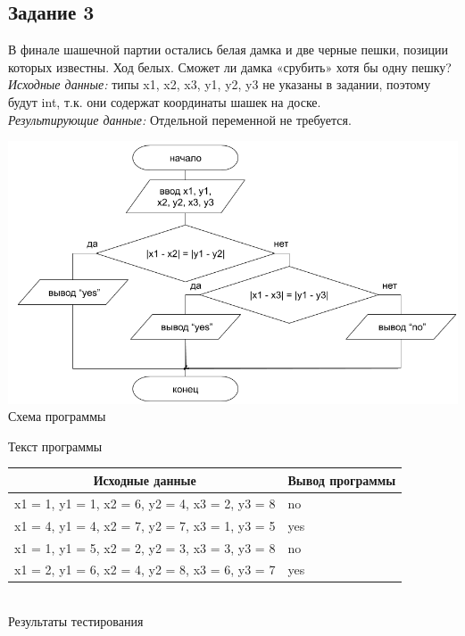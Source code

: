 \documentclass[a4paper,14pt]{extarticle}
\begin{document}
\subsection{Задание 3}
В финале шашечной партии остались белая дамка и две черные пешки, позиции которых известны. Ход белых. Сможет ли дамка «срубить» хотя бы одну пешку?\\
\textit{Исходные данные:} типы x1, x2, x3, y1, y2, y3 не указаны в задании, поэтому будут int, т.к. они содержат координаты шашек на доске.\\
\textit{Результирующие данные:} Отдельной переменной не требуется.\\
\begin{center}
\includegraphics[scale=0.6]{lab2-3.png}\\
Схема программы
\end{center}

\begin{center}
Текст программы
\end{center}
\begin{center}
\begin{tabular}{|l|l|}
\hline
\multicolumn{1}{|c|}{Исходные данные}& \multicolumn{1}{|c|}{Вывод программы}\\
\hline
x1 = 1, y1 = 1, x2 = 6, y2 = 4, x3 = 2, y3 = 8 & no\\
x1 = 4, y1 = 4, x2 = 7, y2 = 7, x3 = 1, y3 = 5 & yes\\
x1 = 1, y1 = 5, x2 = 2, y2 = 3, x3 = 3, y3 = 8 & no\\
x1 = 2, y1 = 6, x2 = 4, y2 = 8, x3 = 6, y3 = 7 & yes\\
\hline
\end{tabular}\\
\vspace{0.3cm}
Результаты тестирования
\end{center}
\end{document}
